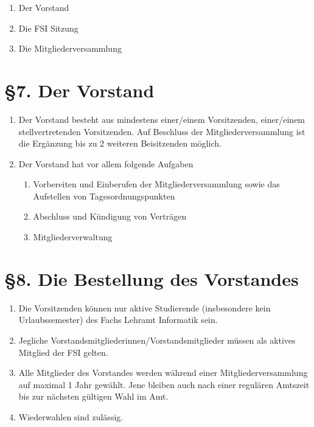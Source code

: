 \documentclass[a4paper,12pt]{article}
\begin{document}
\begin{enumerate}
	\item
		Der Vorstand
	\item
		Die FSI Sitzung
	\item
		Die Mitgliederversammlung
\end{enumerate}

\section*{§7. Der Vorstand}

\begin{enumerate}
    	\item
		Der Vorstand besteht aus mindestens einer/einem Vorsitzenden,
		einer/einem stellvertretenden Vorsitzenden. Auf Beschluss der
		Mitgliederversammlung ist die Ergänzung bis zu 2 weiteren
		Beisitzenden möglich.
    	\item
		Der Vorstand hat vor allem folgende Aufgaben
    		\begin{enumerate}[label=(\roman*)]
			\item
				Vorbereiten und Einberufen der
				Mitgliederversammlung sowie das Aufstellen von
				Tagesordnungspunkten
        		\item
				Abschluss und Kündigung von Verträgen
        		\item
				Mitgliederverwaltung
    		\end{enumerate}
\end{enumerate}

\section*{§8. Die Bestellung des Vorstandes}

\begin{enumerate}
	\item
		Die Vorsitzenden können nur aktive Studierende (insbesondere
		kein Urlaubssemester) des Fachs Lehramt Informatik sein.
	\item
		Jegliche Vorstandsmitgliederinnen/Vorstandsmitglieder müssen
		als aktives Mitglied der FSI gelten.
	\item
		Alle Mitglieder des Vorstandes werden während einer
		Mitgliederversammlung auf maximal 1 Jahr gewählt. Jene bleiben
		auch nach einer regulären Amtszeit bis zur nächsten gültigen
		Wahl im Amt.
	\item
		Wiederwahlen sind zulässig.
\end{enumerate}
\end{document}
